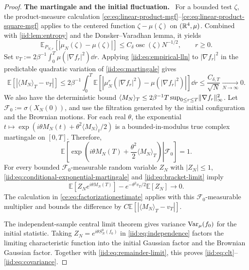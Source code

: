 \documentclass[11pt,reqno]{amsart}
\numberwithin{equation}{section}
\theoremstyle{plain}
\theoremstyle{remark}
\DeclarePairedDelimiter{\norm}{\lVert}{\rVert}
\newcommand{\E}{\mathbb E}\newcommand{\Q}{\mathbb Q}\newcommand{\Pb}{\mathbb P}
\newcommand{\parheading}[1]{\par\medskip\noindent\textbf{#1}\ }
\begin{document}
\begin{proof}
\parheading{The martingale and the initial fluctuation.}
For a bounded test $\zeta$, the product-measure calculation \eqref{ce:eq:linear-product-mgf}--\eqref{ce:eq:linear-product-square-mgf} applies to the centered function $\zeta-\mu(\zeta)$ on $(\mathbb R^4,\mu)$. Combined with \cref{iid:lem:entropy} and the Donsker--Varadhan lemma, it yields
\begin{equation}\label{iid:eq:empirical-lln}
 \E_{P_{N,r}}[|\mu_N(\zeta)-\mu(\zeta)|]
 \le C_\delta\operatorname{osc}(\zeta)N^{-1/2},\qquad r\ge0.
\end{equation}
Set $v_T:=2\beta^{-1}\int_0^T\mu(|\nabla f_r|^2)\dd r$. Applying \eqref{iid:eq:empirical-lln} to $|\nabla f_r|^2$ in the predictable quadratic variation of \eqref{iid:eq:martingale} gives
\begin{equation}\label{iid:eq:bracket-limit}
 \E[|\langle M_N\rangle_T-v_T|]
 \le2\beta^{-1}\int_0^T\E[|\mu_N^r(|\nabla f_r|^2)-\mu(|\nabla f_r|^2)|]\dd r
 \le\frac{C_{\delta,T}}{\sqrt N}\xrightarrow[N\to\infty]{}0.
\end{equation}
We also have the deterministic bound $\langle M_N\rangle_T\le2\beta^{-1}T\sup_{0\le r\le T}\norm{\nabla f_r}_\infty^2$. Let $\mathcal F_0:=\sigma(X_N(0))$, and use the filtration generated by the initial configuration and the Brownian motions. For each real $\theta$, the exponential
$t\mapsto\exp(i\theta M_N(t)+\theta^2\langle M_N\rangle_t/2)$ is a bounded-in-modulus true complex martingale on $[0,T]$. Therefore,
\begin{equation}\label{iid:eq:conditional-exponential-martingale}
 \E\left[\left.
 \exp\left(i\theta M_N(T)+\frac{\theta^2}{2}\langle M_N\rangle_T\right)
 \right|\mathcal F_0\right]=1.
\end{equation}
For every bounded $\mathcal F_0$-measurable random variable $Z_N$ with $|Z_N|\le1$, \eqref{iid:eq:conditional-exponential-martingale} and \eqref{iid:eq:bracket-limit} imply
\begin{equation}\label{iid:eq:independence}
 \E[Z_Ne^{i\theta M_N(T)}]
 -e^{-\theta^2v_T/2}\E[Z_N]\longrightarrow0.
\end{equation}
The calculation in \eqref{ce:eq:factorizationestimate} applies with this $\mathcal F_0$-measurable multiplier and bounds the difference by $C\E[|\langle M_N\rangle_T-v_T|]$.

The independent-sample central limit theorem gives variance $\operatorname{Var}_\mu(f_0)$ for the initial statistic. Taking $Z_N=e^{i\theta S_N^0(f_0)}$ in \eqref{iid:eq:independence} factors the limiting characteristic function into the initial Gaussian factor and the Brownian Gaussian factor. Together with \eqref{iid:eq:remainder-limit}, this proves \eqref{iid:eq:clt}--\eqref{iid:eq:covariance}.
\end{proof}
\end{document}

